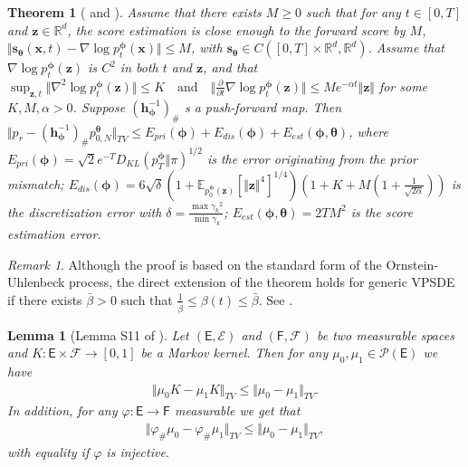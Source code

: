 \documentclass{article}
\newtheorem{theorem}{Theorem}\newtheorem{proposition}{Proposition}
\newtheorem{lemma}{Lemma}
\theoremstyle{definition}
\theoremstyle{remark}
\newtheorem{remark}{Remark}
\begin{document}
	\begingroup
	\renewcommand\thetheorem{4}
	\begin{theorem}[\citet{de2021diffusion} and \citet{guth2022wavelet}]
		Assume that there exists $M\ge 0$ such that for any $t\in[0,T]$ and $\mathbf{z}\in\mathbb{R}^{d}$, the score estimation is close enough to the forward score by $M$, $\Vert\mathbf{s}_{\bm{\theta}}(\mathbf{x},t)-\nabla\log{p_{t}^{\bm{\phi}}(\mathbf{x})}\Vert\le M$, with $\mathbf{s}_{\bm{\theta}}\in C([0,T]\times\mathbb{R}^{d},\mathbb{R}^{d})$. Assume that $\nabla\log{p_{t}^{\bm{\phi}}(\mathbf{z})}$ is $C^{2}$ in both $t$ and $\mathbf{z}$, and that $\sup_{\mathbf{z},t}\Vert\nabla^{2}\log{p_{t}^{\bm{\phi}}(\mathbf{z})}\Vert\le K\quad\text{and}\quad\Vert\frac{\partial}{\partial t}\nabla\log{p_{t}^{\bm{\phi}}(\mathbf{z})}\Vert\le M e^{-\alpha t}\Vert\mathbf{z}\Vert$ for some $K,M,\alpha>0$. Suppose $(\mathbf{h}_{\bm{\phi}}^{-1})_{\#}$ s a push-forward map. Then $\Vert p_{r}-(\mathbf{h}_{\bm{\phi}}^{-1})_{\#}p_{0,N}^{\bm{\theta}}\Vert_{TV}\le E_{pri}(\bm{\phi})+E_{dis}(\bm{\phi})+E_{est}(\bm{\phi},\bm{\theta})$, where $E_{pri}(\bm{\phi})=\sqrt{2}e^{-T}D_{KL}(p_{T}^{\bm{\phi}}\Vert\pi)^{1/2}$ is the error originating from the prior mismatch; $E_{dis}(\bm{\phi})=6\sqrt{\delta}(1+\mathbb{E}_{p_{0}^{\bm{\phi}}(\mathbf{z})}[\Vert\mathbf{z}\Vert^{4}]^{1/4})(1+K+M(1+\frac{1}{\sqrt{2\alpha}}))$ is the discretization error with $\delta=\frac{\max{\gamma_{k}}^{2}}{\min{\gamma_{k}}}$; $E_{est}(\bm{\phi},\bm{\theta})=2TM^{2}$ is the score estimation error.
	\end{theorem}
	\endgroup
	\begin{remark}
		Although the proof is based on the standard form of the Ornstein-Uhlenbeck process, the direct extension of the theorem holds for generic VPSDE if there exists $\bar{\beta}>0$ such that $\frac{1}{\bar{\beta}}\le\beta(t)\le\bar{\beta}$. See \citet{de2022convergence}.
	\end{remark}
	\begin{lemma}[Lemma S11 of \citet{de2021diffusion}]\label{lemma:S11}
		Let $(\mathsf{E},\mathcal{E})$ and $(\mathsf{F},\mathcal{F})$ be two measurable spaces and $K:\mathsf{E}\times\mathcal{F}\rightarrow [0,1]$ be a Markov kernel. Then for any $\mu_{0},\mu_{1}\in\mathcal{P}(\mathsf{E})$ we have
		\begin{align*}
		\Vert\mu_{0}K-\mu_{1}K\Vert_{TV}\le\Vert\mu_{0}-\mu_{1}\Vert_{TV}.
		\end{align*}
		In addition, for any $\varphi:\mathsf{E}\rightarrow\mathsf{F}$ measurable we get that
		\begin{align*}
		\Vert\varphi_{\#}\mu_{0}-\varphi_{\#}\mu_{1}\Vert_{TV}\le\Vert\mu_{0}-\mu_{1}\Vert_{TV},
		\end{align*}
		with equality if $\varphi$ is injective.
	\end{lemma}
	
\end{document}

